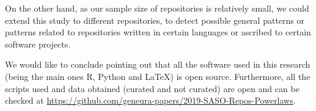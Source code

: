 \documentclass{article}
\begin{document}
On the other hand, as our sample size of repositories is relatively small, we could
extend this study to different repositories, to detect possible
general patterns or patterns related to repositories written in
certain languages or ascribed to certain software projects.

We would like to conclude pointing out that all the software used in
this research (being the main ones R\cite{R}, Python \cite{CS-R9526}
and \LaTeX) is open source. Furthermore, all the scripts used and data
obtained (curated and not curated) are open and can be checked at
\url{https://github.com/geneura-papers/2019-SASO-Repos-Powerlaws}.



\end{document}
